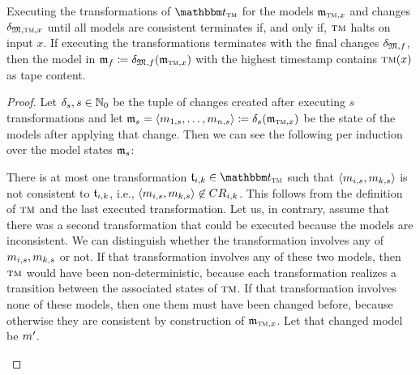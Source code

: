 \begin{lemma}
    \label{lemma:turing_machine_construction}
    Executing the transformations of $\transformationset{T}_{\TuringMachine}$ for the models $\modeltuple{m}_{\TuringMachine,x}$ and changes $\changetuple{\metamodeltuple{M},\TuringMachine,x}$ until all models are consistent %
    terminates if, and only if, $\textsc{tm}$ halts on input $x$.
	If executing the transformations terminates with the final changes $\changetuple{\metamodeltuple{M},f}$, then the model in $\modeltuple{m}_{f} \equalsperdefinition \changetuple{\metamodeltuple{M},f}(\modeltuple{m}_{\TuringMachine,x})$ with the highest timestamp contains $\textsc{tm}(x)$ as tape content.
\end{lemma}
\begin{proof}
    Let $\mathfrak{\delta}_{s}, s \in \mathbb{N}_0$ be the tuple of changes created after executing $s$ transformations and let $\modeltuple{m}_{s} = \tupled{\model{m}{1,s}, \dots, \model{m}{n,s}}\equalsperdefinition \changetuple{s}(\modeltuple{m}_{\TuringMachine,x})$ be the state of the models after applying that change.
    Then we can see the following per induction over the model states $\modeltuple{m}_{s}$:
	\begin{longenumerate} %
        \item 
            There is at most one transformation $\transformation{t}_{i,k} \in \transformationset{T}_{\TuringMachine}$ such that $\tupled{\model{m}{i,s},\model{m}{k,s}}$ is not consistent to $\transformation{t}_{i,k}$, i.e., $\tupled{\model{m}{i,s},\model{m}{k,s}} \not\in \consistencyrelation{CR}{i,k}$.
            This follows from the definition of $\textsc{tm}$ and the last executed transformation.
            Let us, in contrary, assume that there was a second transformation that could be executed because the models are inconsistent. 
            We can distinguish whether the transformation involves any of $\model{m}{i,s},\model{m}{k,s}$ or not.
            If that transformation involves any of these two models, then $\textsc{tm}$ would have been non-deterministic, because each transformation realizes a transition between the associated states of $\textsc{tm}$.
            If that transformation involves none of these models, then one them must have been changed before, because otherwise they are consistent by construction of $\modeltuple{m}_{\TuringMachine,x}$.
            Let that changed model be $\model{m}{}'$.

\end{longenumerate}
\end{proof}
